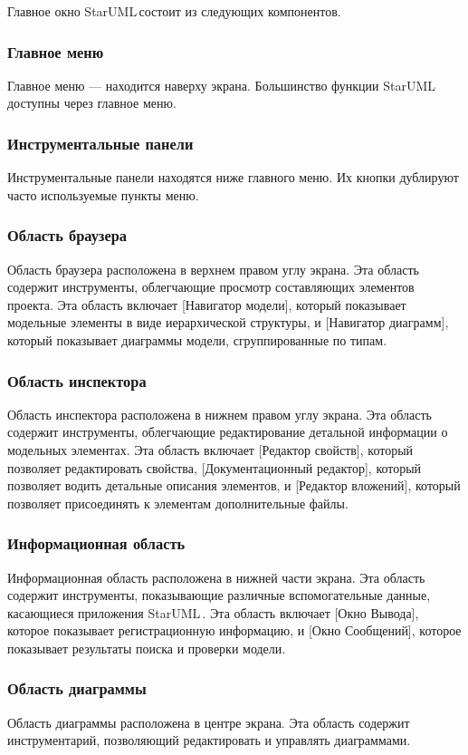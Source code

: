 \documentclass[a4paper,12pt]{extreport}
\newcommand{\staruml}{StarUML\,\tm}
\begin{document}
Главное окно \staruml состоит из следующих компонентов.
\subsubsection*{Главное меню}
Главное меню --- находится наверху экрана. Большинство функции \staruml доступны через
главное меню.

\subsubsection*{Инструментальные панели}
Инструментальные панели находятся ниже главного меню. Их кнопки дублируют часто
используемые пункты меню.

\subsubsection*{Область браузера}
Область браузера расположена в верхнем правом углу экрана. Эта область содержит
инструменты, облегчающие просмотр составляющих элементов проекта. Эта область включает
[Навигатор модели], который показывает модельные элементы в виде иерархической структуры, и
[Навигатор диаграмм], который показывает диаграммы модели, сгруппированные по типам.

\subsubsection*{Область инспектора}
Область инспектора расположена в нижнем правом углу экрана. Эта область содержит
инструменты, облегчающие редактирование детальной информации о модельных элементах. Эта
область включает [Редактор свойств], который позволяет редактировать свойства,
[Документационный редактор], который позволяет водить детальные описания элементов, и
[Редактор вложений], который позволяет присоединять к элементам дополнительные файлы.
\subsubsection*{Информационная область}
Информационная область расположена в нижней части экрана. Эта область содержит
инструменты, показывающие различные вспомогательные данные, касающиеся приложения
\staruml. Эта область включает [Окно Вывода], которое показывает регистрационную
информацию, и [Окно Сообщений], которое показывает результаты поиска и проверки модели.
\subsubsection*{Область диаграммы}
Область диаграммы расположена в центре экрана. Эта область содержит инструментарий,
позволяющий редактировать и управлять диаграммами.
\end{document}
